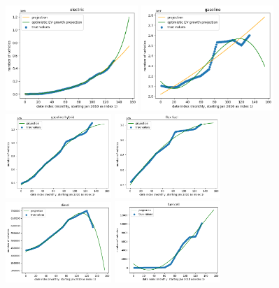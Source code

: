 \documentclass{article}
\begin{document}
\begin{figure}
\begin{center}
    \includegraphics[width=5cm]{imgs/electric_proj.png}
    \includegraphics[width=5cm]{imgs/gasoline_proj.png}\\
    \includegraphics[width=4cm]{imgs/gasoline_hybrid_proj.png}
    \includegraphics[width=4cm]{imgs/flex_fuel_proj.png}
    \includegraphics[width=4cm]{imgs/diesel_proj.png}
    \includegraphics[width=4cm]{imgs/fuel_cell_proj.png}

\end{center}
\end{figure}
\end{document}
